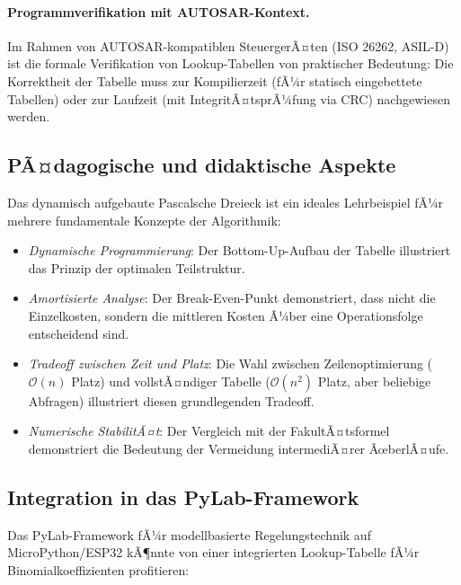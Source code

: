 ﻿\documentclass[12pt, a4paper]{article}
\newcommand{\Oh}{\mathcal{O}}
\theoremstyle{plain}
\theoremstyle{definition}
\theoremstyle{remark}
\renewcommand{\Oh}{\mathcal{O}}
\begin{document}
\paragraph{Programmverifikation mit AUTOSAR-Kontext.}
Im Rahmen von AUTOSAR-kompatiblen SteuergerÃ¤ten \cite{epp2026autosar}
(ISO 26262, ASIL-D) ist die formale Verifikation von Lookup-Tabellen
von praktischer Bedeutung: Die Korrektheit der Tabelle muss zur
Kompilierzeit (fÃ¼r statisch eingebettete Tabellen) oder zur Laufzeit
(mit IntegritÃ¤tsprÃ¼fung via CRC) nachgewiesen werden.

\subsection{PÃ¤dagogische und didaktische Aspekte}

Das dynamisch aufgebaute Pascalsche Dreieck ist ein ideales
Lehrbeispiel fÃ¼r mehrere fundamentale Konzepte der Algorithmik:
\begin{itemize}
  \item \emph{Dynamische Programmierung}: Der Bottom-Up-Aufbau der
        Tabelle illustriert das Prinzip der optimalen Teilstruktur.
  \item \emph{Amortisierte Analyse}: Der Break-Even-Punkt demonstriert,
        dass nicht die Einzelkosten, sondern die mittleren Kosten
        Ã¼ber eine Operationsfolge entscheidend sind.
  \item \emph{Tradeoff zwischen Zeit und Platz}: Die Wahl zwischen
        Zeilenoptimierung ($\Oh(n)$ Platz) und vollstÃ¤ndiger Tabelle
        ($\Oh(n^2)$ Platz, aber beliebige Abfragen) illustriert diesen
        grundlegenden Tradeoff.
  \item \emph{Numerische StabilitÃ¤t}: Der Vergleich mit der FakultÃ¤tsformel
        demonstriert die Bedeutung der Vermeidung intermediÃ¤rer ÃœberlÃ¤ufe.
\end{itemize}

\subsection{Integration in das PyLab-Framework}

Das PyLab-Framework \cite{epp2026pylab} fÃ¼r modellbasierte Regelungstechnik
auf MicroPython/ESP32 kÃ¶nnte von einer integrierten Lookup-Tabelle fÃ¼r
Binomialkoeffizienten profitieren:
\end{document}
